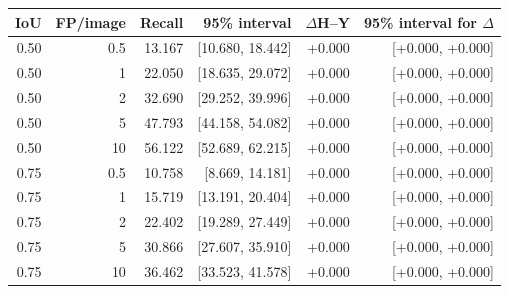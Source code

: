 \begin{tabular}{rrrrrr}
\toprule
IoU & FP/image & Recall & 95\% interval & $\Delta$H--Y & 95\% interval for $\Delta$\\
\midrule
0.50 & 0.5 & 13.167 & [10.680, 18.442] & +0.000 & [+0.000, +0.000]\\
0.50 & 1 & 22.050 & [18.635, 29.072] & +0.000 & [+0.000, +0.000]\\
0.50 & 2 & 32.690 & [29.252, 39.996] & +0.000 & [+0.000, +0.000]\\
0.50 & 5 & 47.793 & [44.158, 54.082] & +0.000 & [+0.000, +0.000]\\
0.50 & 10 & 56.122 & [52.689, 62.215] & +0.000 & [+0.000, +0.000]\\
0.75 & 0.5 & 10.758 & [8.669, 14.181] & +0.000 & [+0.000, +0.000]\\
0.75 & 1 & 15.719 & [13.191, 20.404] & +0.000 & [+0.000, +0.000]\\
0.75 & 2 & 22.402 & [19.289, 27.449] & +0.000 & [+0.000, +0.000]\\
0.75 & 5 & 30.866 & [27.607, 35.910] & +0.000 & [+0.000, +0.000]\\
0.75 & 10 & 36.462 & [33.523, 41.578] & +0.000 & [+0.000, +0.000]\\
\bottomrule
\end{tabular}
